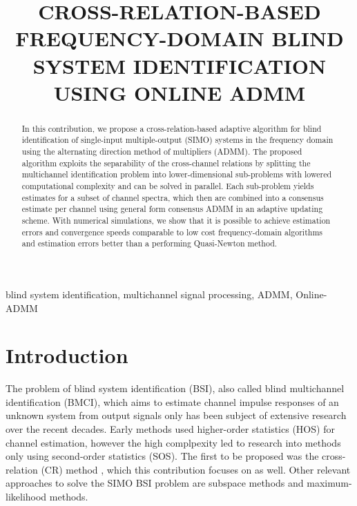 \documentclass{article}
\title{CROSS-RELATION-BASED FREQUENCY-DOMAIN BLIND SYSTEM IDENTIFICATION USING ONLINE ADMM}
\begin{document}
%
\maketitle
%
\begin{abstract}
    In this contribution, we propose a cross-relation-based adaptive algorithm for blind identification of single-input multiple-output (SIMO) systems in the frequency domain using the alternating direction method of multipliers (ADMM).
    The proposed algorithm exploits the separability of the cross-channel relations by splitting the multichannel identification problem into lower-dimensional sub-problems with lowered computational complexity and can be solved in parallel.
    Each sub-problem yields estimates for a subset of channel spectra, which then are combined into a consensus estimate per channel using general form consensus ADMM in an adaptive updating scheme.
    With numerical simulations, we show that it is possible to achieve estimation errors and convergence speeds comparable to low cost frequency-domain algorithms and estimation errors better than a performing Quasi-Newton method.
\end{abstract}
%
\begin{keywords}
    blind system identification, multichannel signal processing, ADMM, Online-ADMM
\end{keywords}
%
\section{Introduction}
\label{sec:intro}
The problem of blind system identification (BSI), also called blind multichannel identification (BMCI), which aims to estimate channel impulse responses of an unknown system from output signals only has been subject of extensive research over the recent decades.
Early methods used higher-order statistics (HOS) \cite{satoMethodSelfRecoveringEqualization1975} for channel estimation, however the high complpexity led to research into methods only using second-order statistics (SOS).
The first to be proposed was the cross-relation (CR) method \cite{tong1994blind, guanghanxuLeastsquaresApproachBlind1995}, which this contribution focuses on as well.
Other relevant approaches to solve the SIMO BSI problem are subspace methods \cite{moulinesSubspaceMethodsBlind1995,gannotSubspaceMethodsMultimicrophone2003,diamantarasEfficientSubspaceMethod2008,mayyalaStructureBasedSubspaceMethod2017} and maximum-likelihood \cite{yingbohuaFastMaximumLikelihood1996} methods.
\end{document}
